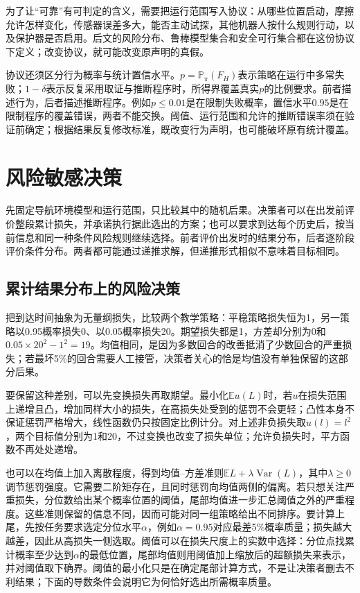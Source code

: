 为了让“可靠”有可判定的含义，需要把运行范围写入协议：从哪些位置启动，摩擦允许怎样变化，传感器误差多大，能否主动试探，其他机器人按什么规则行动，以及保护器是否启用。后文的风险分布、鲁棒模型集合和安全可行集合都在这份协议下定义；改变协议，就可能改变原声明的真假。

协议还须区分行为概率与统计置信水平。$p=\mathbb P_\pi(F_H)$表示策略在运行中多常失败；$1-\delta$表示反复采用取证与推断程序时，所得界覆盖真实$p$的比例要求。前者描述行为，后者描述推断程序。例如$p\leq0.01$是在限制失败概率，置信水平$0.95$是在限制程序的覆盖错误，两者不能交换。阈值、运行范围和允许的推断错误率须在验证前确定；根据结果反复修改标准，既改变行为声明，也可能破坏原有统计覆盖。

\section{风险敏感决策}
\label{sec:rl-trustworthy-risk}

先固定导航环境模型和运行范围，只比较其中的随机后果。决策者可以在出发前评价整段累计损失，并承诺执行据此选出的方案；也可以要求到达每个历史后，按当前信息和同一种条件风险规则继续选择。前者评价出发时的结果分布，后者逐阶段评价条件分布。两者都可能通过递推求解，但递推形式相似不意味着目标相同。

\subsection{累计结果分布上的风险决策}
\label{sec:rl-trustworthy-static-risk}

把到达时间抽象为无量纲损失，比较两个教学策略：平稳策略损失恒为1，另一策略以0.95概率损失0、以0.05概率损失20。期望损失都是1，方差却分别为0和$0.05\times20^2-1^2=19$。均值相同，是因为多数回合的改善抵消了少数回合的严重损失；若最坏5\%的回合需要人工接管，决策者关心的恰是均值没有单独保留的这部分后果。

要保留这种差别，可以先变换损失再取期望。最小化$\mathbb E u(L)$时，若$u$在损失范围上递增且凸，增加同样大小的损失，在高损失处受到的惩罚不会更轻；凸性本身不保证惩罚严格增大，线性函数仍只按固定比例计分。对上述非负损失取$u(l)=l^2$，两个目标值分别为1和20，不过变换也改变了损失单位；允许负损失时，平方函数不再处处递增。

也可以在均值上加入离散程度，得到均值--方差准则$\mathbb E L+\lambda\operatorname{Var}(L)$，其中$\lambda\geq0$调节惩罚强度。它需要二阶矩存在，且同时惩罚向均值两侧的偏离。若只想关注严重损失，分位数给出某个概率位置的阈值，尾部均值进一步汇总阈值之外的严重程度。这些准则保留的信息不同，因而可能对同一组策略给出不同排序。要计算上尾，先按任务要求选定分位水平$\alpha$，例如$\alpha=0.95$对应最差5\%概率质量；损失越大越差，因此从高损失一侧选取。阈值可以在损失尺度上的实数中选择：分位点找累计概率至少达到$\alpha$的最低位置，尾部均值则用阈值加上缩放后的超额损失来表示，并对阈值取下确界。阈值的最小化只是在确定尾部计算方式，不是让决策者删去不利结果；下面的导数条件会说明它为何恰好选出所需概率质量。


